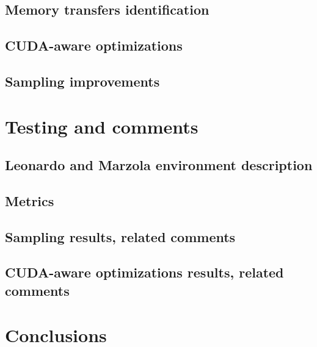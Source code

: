 \section{Memory transfers identification}
\label{cha:memtransfers}
\section{CUDA-aware optimizations}
\label{cha:cudaaware}
\section{Sampling improvements}
\label{cha:sampling-improvements}

\chapter{Testing and comments}
\label{cha:testing}
\section{Leonardo and Marzola environment description}
\label{cha:testing-environment}
\section{Metrics}
\label{cha:testing-metrics}
\section{Sampling results, related comments}
\label{cha:sample-results}
\section{CUDA-aware optimizations results, related comments}
\label{cha:cudaaware-results}

\chapter{Conclusions}
\label{cha:conclusions}